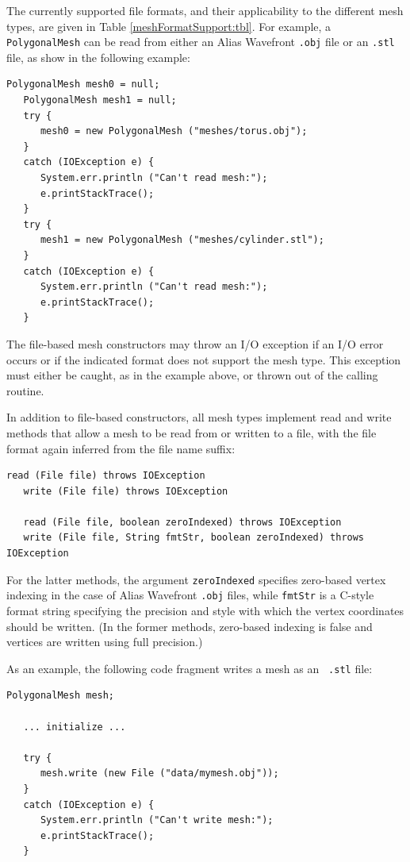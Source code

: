 The currently supported file formats, and their applicability to the
different mesh types, are given in Table
\ref{meshFormatSupport:tbl}.
For example, a {\tt PolygonalMesh} can be read from either an Alias
Wavefront {\tt .obj} file or an {\tt .stl} file, as show in the
following example:
%
\begin{lstlisting}[]
   PolygonalMesh mesh0 = null;
   PolygonalMesh mesh1 = null;
   try {
      mesh0 = new PolygonalMesh ("meshes/torus.obj");
   }
   catch (IOException e) {
      System.err.println ("Can't read mesh:");
      e.printStackTrace();
   }
   try {
      mesh1 = new PolygonalMesh ("meshes/cylinder.stl");
   }
   catch (IOException e) {
      System.err.println ("Can't read mesh:");
      e.printStackTrace();
   }
\end{lstlisting}
%
The file-based mesh constructors may throw an I/O exception if an I/O
error occurs or if the indicated format does not support the mesh
type. This exception must either be caught, as in the example above,
or thrown out of the calling routine.

In addition to file-based constructors, all mesh types implement read
and write methods that allow a mesh to be read from or written to a
file, with the file format again inferred from the file name suffix:
\begin{lstlisting}[]
   read (File file) throws IOException
   write (File file) throws IOException

   read (File file, boolean zeroIndexed) throws IOException
   write (File file, String fmtStr, boolean zeroIndexed) throws IOException
\end{lstlisting}
%
For the latter methods, the argument {\tt zeroIndexed} specifies
zero-based vertex indexing in the case of Alias Wavefront {\tt .obj}
files, while {\tt fmtStr} is a C-style format string specifying the
precision and style with which the vertex coordinates should be
written. (In the former methods, zero-based indexing is false and
vertices are written using full precision.)

As an example, the following code fragment writes a mesh as an {\tt
.stl} file:
%
\begin{lstlisting}[]
   PolygonalMesh mesh;

   ... initialize ...

   try {
      mesh.write (new File ("data/mymesh.obj"));
   }
   catch (IOException e) {
      System.err.println ("Can't write mesh:");
      e.printStackTrace();
   }
\end{lstlisting}
%

